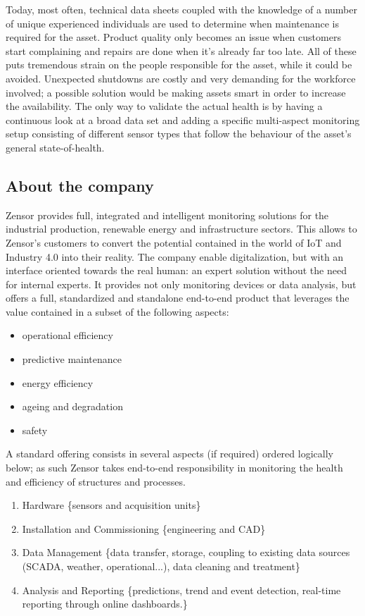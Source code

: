 Today, most often, technical data sheets coupled with the knowledge of a number of unique experienced individuals are used to determine when maintenance is required for the asset. 
Product quality only becomes an issue when customers start complaining and repairs are done when it's already far too late.
All of these puts tremendous strain on the people responsible for the asset, while it could be avoided.
Unexpected shutdowns are costly and very demanding for the workforce involved; a possible solution would be making assets smart in order to increase the availability.
The only way to validate the actual health is by having a continuous look at a broad data set and adding a specific multi-aspect monitoring setup 
consisting of different sensor types that follow the behaviour of the asset's general state-of-health.
\subsection{About the company}
Zensor \cite{Misc:zensor_official_website} provides full, integrated and intelligent monitoring solutions for the industrial production, renewable energy and infrastructure sectors.
This allows to Zensor's customers to convert the potential contained in the world of IoT and Industry 4.0 into their reality. 
The company enable digitalization, but with an interface oriented towards the real human: an expert solution without the need for internal experts.
It provides not only monitoring devices or data analysis, but offers a full, standardized and standalone end-to-end product that leverages the value contained in a subset of the following aspects:
\begin{itemize}
    \item operational efficiency
    \item predictive maintenance
    \item energy efficiency
    \item ageing and degradation
    \item safety 
\end{itemize}
A standard offering consists in several aspects (if required) ordered logically below; as such Zensor takes end-to-end responsibility in monitoring the health and efficiency of structures and processes.
\begin{enumerate}
    \item Hardware \{sensors and acquisition units\}
    \item Installation and Commissioning \{engineering and CAD\}
    \item Data Management \{data transfer, storage, coupling to existing data sources (SCADA, weather, operational...), data cleaning and treatment\}
    \item Analysis and Reporting \{predictions, trend and event detection, real-time reporting through online dashboards.\}
\end{enumerate}
